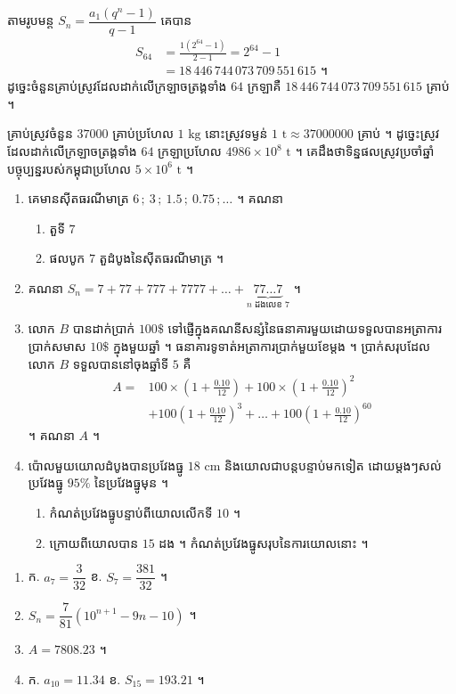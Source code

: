 តាមរូបមន្ត $S_n = \dfrac{a_1(q^n - 1)}{q - 1}$ គេបាន
\[
\begin{aligned}
S_{64} &= \frac{1(2^{64} - 1)}{2 - 1} = 2^{64} - 1\\
&= 18\,446\,744\,073\,709\,551\,615 \text{ ។}
\end{aligned}
\]
ដូច្នេះចំនួនគ្រាប់ស្រូវដែលដាក់លើក្រឡាចត្រង្គទាំង $64$ ក្រឡាគឺ $18\,446\,744\,073\,709\,551\,615$ គ្រាប់ ។

គ្រាប់ស្រូវចំនួន $37000$ គ្រាប់ប្រហែល $1\text{ kg}$ នោះស្រូវទម្ងន់ $1\text{ t} \approx 37000000$ គ្រាប់ ។ ដូច្នេះស្រូវដែលដាក់លើក្រឡាចត្រង្គទាំង $64$ ក្រឡាប្រហែល $4986 \times 10^8\text{ t}$ ។ គេដឹងថាទិន្នផលស្រូវប្រចាំឆ្នាំបច្ចុប្បន្នរបស់កម្ពុជាប្រហែល $5 \times 10^6\text{ t}$ ។

\begin{pro}
\begin{enumerate}[1]
  \item គេមានស៊ីតធរណីមាត្រ $6\,;\ 3\,;\ 1.5\,;\ 0.75\,;\ldots$ ។ គណនា
  \begin{enumerate}[a]
    \item តួទី $7$
    \item ផលបូក $7$ តួដំបូងនៃស៊ីតធរណីមាត្រ ។
  \end{enumerate}
  \item គណនា $S_n = 7 + 77 + 777 + 7777 + \ldots + \underbrace{77\ldots7}_{n \text{ ដងលេខ } 7}$ ។
  \item លោក $B$ បានដាក់ប្រាក់ $100\$$ ទៅផ្ញើក្នុងគណនីសន្សំនៃធនាគារមួយដោយទទួលបានអត្រាការប្រាក់សមាស $10\$$ ក្នុងមួយឆ្នាំ ។ ធនាគារទូទាត់អត្រាការប្រាក់មួយខែម្តង ។ ប្រាក់សរុបដែលលោក $B$ ទទួលបាននៅចុងឆ្នាំទី $5$ គឺ
  \[ \begin{aligned} A = {}&100 \times \left(1 + \frac{0.10}{12}\right) + 100 \times \left(1 + \frac{0.10}{12}\right)^2\\ &+ 100\left(1 + \frac{0.10}{12}\right)^3 + \ldots + 100\left(1 + \frac{0.10}{12}\right)^{60} \end{aligned} \]
  ។ គណនា $A$ ។
  \item ប៉ោលមួយយោលដំបូងបានប្រវែងធ្នូ $18\text{ cm}$ និងយោលជាបន្តបន្ទាប់មកទៀត ដោយម្តងៗសល់ប្រវែងធ្នូ $95\%$ នៃប្រវែងធ្នូមុន ។
  \begin{enumerate}[a]
    \item កំណត់ប្រវែងធ្នូបន្ទាប់ពីយោលលើកទី $10$ ។
    \item ក្រោយពីយោលបាន $15$ ដង ។ កំណត់ប្រវែងធ្នូសរុបនៃការយោលនោះ ។
  \end{enumerate}
\end{enumerate}
\ans
\begin{enumerate}[1]
  \item ក. $a_7 = \dfrac{3}{32}$ \quad ខ. $S_7 = \dfrac{381}{32}$ ។
  \item $S_n = \dfrac{7}{81}(10^{n+1} - 9n - 10)$ ។
  \item $A = 7808.23$ ។
  \item ក. $a_{10} = 11.34$ \quad ខ. $S_{15} = 193.21$ ។
\end{enumerate}
\end{pro}

